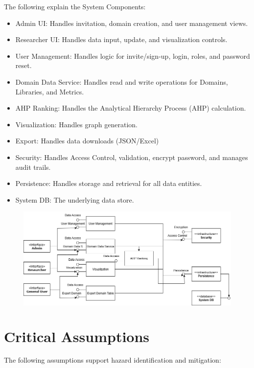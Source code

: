 \documentclass{article}
\begin{document}
The following explain the System Components:
\begin{itemize}
    \item Admin UI: Handles invitation, domain creation, and user management views.
    \item Researcher UI: Handles data input, update, and visualization controls.
    \item User Management: Handles logic for invite/sign-up, login, roles, and password reset.
    \item Domain Data Service: Handles read and write operations for Domains, Libraries, and Metrics.
    \item AHP Ranking: Handles the Analytical Hierarchy Process (AHP) calculation.
    \item Visualization: Handles graph generation.
    \item Export: Handles data downloads (JSON/Excel)
    \item Security: Handles Access Control, validation, encrypt password, and manages audit trails.
    \item Persistence: Handles storage and retrieval for all data entities.
    \item System DB: The underlying data store.
\end{itemize}

\begin{figure}[H]
    \centering
    \includegraphics[scale=0.5] {images/component.png}
\end{figure}

\section{Critical Assumptions}

The following assumptions support hazard identification and mitigation:
\end{document}
